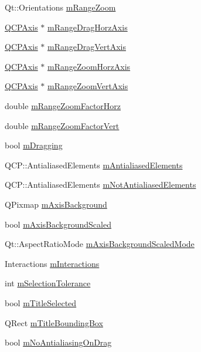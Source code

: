 \begin{DoxyCompactItemize}
Qt\+::\+Orientations \hyperlink{a00116_ac12a0fb503fccb899d786ceaa0a1a4f7}{m\+Range\+Zoom}
\item 
\hyperlink{a00025}{Q\+C\+P\+Axis} $\ast$ \hyperlink{a00116_ae73b7d61e9c0b25088f1cd805fc6f269}{m\+Range\+Drag\+Horz\+Axis}
\item 
\hyperlink{a00025}{Q\+C\+P\+Axis} $\ast$ \hyperlink{a00116_a13364bbe1871cc2810ebd8946e30cc49}{m\+Range\+Drag\+Vert\+Axis}
\item 
\hyperlink{a00025}{Q\+C\+P\+Axis} $\ast$ \hyperlink{a00116_a3239b66fb24563a5dda0503a69a892d5}{m\+Range\+Zoom\+Horz\+Axis}
\item 
\hyperlink{a00025}{Q\+C\+P\+Axis} $\ast$ \hyperlink{a00116_a16094e9a3c30151c3c820cd9d4894b84}{m\+Range\+Zoom\+Vert\+Axis}
\item 
double \hyperlink{a00116_a575195f0c4e9f7a766495da2ac41e0a6}{m\+Range\+Zoom\+Factor\+Horz}
\item 
double \hyperlink{a00116_a133700b56f6b8e472f99058b43f5a0e9}{m\+Range\+Zoom\+Factor\+Vert}
\item 
bool \hyperlink{a00116_ad1273fad7e12b0f61819343368778928}{m\+Dragging}
\item 
Q\+C\+P\+::\+Antialiased\+Elements \hyperlink{a00116_a18feaee1080c45b74782bdbf0c252f89}{m\+Antialiased\+Elements}
\item 
Q\+C\+P\+::\+Antialiased\+Elements \hyperlink{a00116_ac566e9d774e49dc4190346e02f31dcdf}{m\+Not\+Antialiased\+Elements}
\item 
Q\+Pixmap \hyperlink{a00116_ab93f80321dad937ebc6f2eaad1640c50}{m\+Axis\+Background}
\item 
bool \hyperlink{a00116_aa02865bc98b010e95c3aab39a3439ed0}{m\+Axis\+Background\+Scaled}
\item 
Qt\+::\+Aspect\+Ratio\+Mode \hyperlink{a00116_a513c32c470438510a3341295b0ead04a}{m\+Axis\+Background\+Scaled\+Mode}
\item 
Interactions \hyperlink{a00116_af8d040767753acc548b2368dd4150ae6}{m\+Interactions}
\item 
int \hyperlink{a00116_a6694031fcdb13682d098f5d21da86f97}{m\+Selection\+Tolerance}
\item 
bool \hyperlink{a00116_a36e38c73ea27866ded778ca2a4ce907e}{m\+Title\+Selected}
\item 
Q\+Rect \hyperlink{a00116_ab64b411eef7fd9d890c871993116d289}{m\+Title\+Bounding\+Box}
\item 
bool \hyperlink{a00116_abfc5e49800e5ca84fa6312b9bb814b3b}{m\+No\+Antialiasing\+On\+Drag}
\item 

\end{DoxyCompactItemize}
